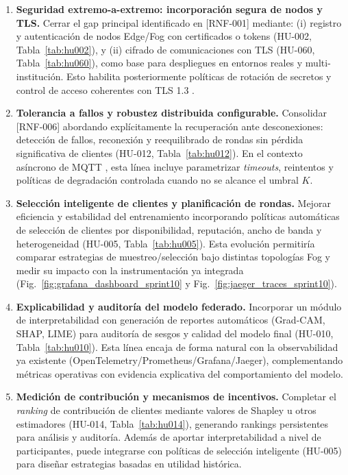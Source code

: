 \documentclass{report}
\begin{document}
\begin{enumerate}\setlength\itemsep{0.45em}

  \item \textbf{Seguridad extremo-a-extremo: incorporación segura de nodos y TLS.}  
  Cerrar el gap principal identificado en [RNF-001] mediante: (i) registro y autenticación de nodos Edge/Fog con certificados o tokens (HU-002, Tabla~\ref{tab:hu002}), y (ii) cifrado de comunicaciones con TLS (HU-060, Tabla~\ref{tab:hu060}), como base para despliegues en entornos reales y multi-institución. Esto habilita posteriormente políticas de rotación de secretos y control de acceso coherentes con TLS 1.3 \cite{rfc8446_tls13}.


  \item \textbf{Tolerancia a fallos y robustez distribuida configurable.}  
  Consolidar [RNF-006] abordando explícitamente la recuperación ante desconexiones: detección de fallos, reconexión y reequilibrado de rondas sin pérdida significativa de clientes (HU-012, Tabla~\ref{tab:hu012}). En el contexto asíncrono de MQTT , esta línea incluye parametrizar \textit{timeouts}, reintentos y políticas de degradación controlada cuando no se alcance el umbral $K$.

  \item \textbf{Selección inteligente de clientes y planificación de rondas.}  
  Mejorar eficiencia y estabilidad del entrenamiento incorporando políticas automáticas de selección de clientes por disponibilidad, reputación, ancho de banda y heterogeneidad (HU-005, Tabla~\ref{tab:hu005}). Esta evolución permitiría comparar estrategias de muestreo/selección bajo distintas topologías Fog y medir su impacto con la instrumentación ya integrada (Fig.~\ref{fig:grafana_dashboard_sprint10} y Fig.~\ref{fig:jaeger_traces_sprint10}).

  \item \textbf{Explicabilidad y auditoría del modelo federado.}  
  Incorporar un módulo de interpretabilidad con generación de reportes automáticos (Grad-CAM, SHAP, LIME) para auditoría de sesgos y calidad del modelo final (HU-010, Tabla~\ref{tab:hu010}). Esta línea encaja de forma natural con la observabilidad ya existente (OpenTelemetry/Prometheus/Grafana/Jaeger), complementando métricas operativas con evidencia explicativa del comportamiento del modelo.

  \item \textbf{Medición de contribución y mecanismos de incentivos.}  
  Completar el \textit{ranking} de contribución de clientes mediante valores de Shapley u otros estimadores (HU-014, Tabla~\ref{tab:hu014}), generando rankings persistentes para análisis y auditoría. Además de aportar interpretabilidad a nivel de participantes, puede integrarse con políticas de selección inteligente (HU-005) para diseñar estrategias basadas en utilidad histórica.


\end{enumerate}
\end{document}
